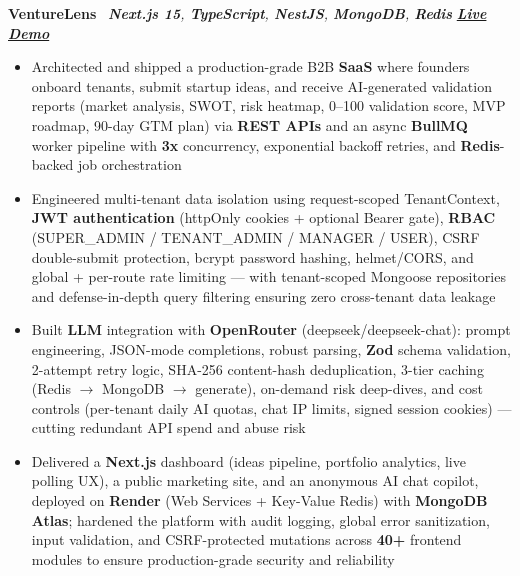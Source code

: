 \documentclass[a4paper,10pt]{article}
\newcommand{\resumeskipentry}{\vspace{5pt}}
\newcommand{\resumejobtitle}{\fontsize{10pt}{12pt}\selectfont\bfseries\color{primary}}
\newcommand{\resumejobmeta}{\fontsize{10pt}{12pt}\selectfont\itshape\color{bodytext}}
\newcommand{\resumedate}{\fontsize{10pt}{12pt}\selectfont\itshape\color{bodytext}}
\newcommand{\kw}[1]{\textbf{\color{primary}#1}}
\newcommand{\metric}[1]{\textbf{\color{accent}#1}}
\newcommand{\demolink}[2]{\href{#1}{\textcolor{accent}{\textbf{#2}}}}
\newcommand{\projectentry}[4]{%
    \noindent
    {\resumejobtitle #1} \textbar\ {\resumejobmeta #2} \hfill {\resumedate #3}%
    \begin{itemize}
        #4
    \end{itemize}%
    \resumeskipentry
}
\begin{document}
\projectentry{VentureLens}{\kw{Next.js 15}, \kw{TypeScript}, \kw{NestJS}, \kw{MongoDB}, \kw{Redis}}{\demolink{https://venturelens-dhqq.onrender.com}{Live Demo}}{%
    \item Architected and shipped a production-grade B2B \kw{SaaS} where founders onboard tenants, submit startup ideas, and receive AI-generated validation reports (market analysis, SWOT, risk heatmap, 0--100 validation score, MVP roadmap, 90-day GTM plan) via \kw{REST APIs} and an async \kw{BullMQ} worker pipeline with \metric{3x} concurrency, exponential backoff retries, and \kw{Redis}-backed job orchestration
    \item Engineered multi-tenant data isolation using request-scoped TenantContext, \kw{JWT authentication} (httpOnly cookies + optional Bearer gate), \kw{RBAC} (SUPER\_ADMIN / TENANT\_ADMIN / MANAGER / USER), CSRF double-submit protection, bcrypt password hashing, helmet/CORS, and global + per-route rate limiting --- with tenant-scoped Mongoose repositories and defense-in-depth query filtering ensuring zero cross-tenant data leakage
    \item Built \kw{LLM} integration with \kw{OpenRouter} (deepseek/deepseek-chat): prompt engineering, JSON-mode completions, robust parsing, \kw{Zod} schema validation, 2-attempt retry logic, SHA-256 content-hash deduplication, 3-tier caching (Redis $\rightarrow$ MongoDB $\rightarrow$ generate), on-demand risk deep-dives, and cost controls (per-tenant daily AI quotas, chat IP limits, signed session cookies) --- cutting redundant API spend and abuse risk
    \item Delivered a \kw{Next.js} dashboard (ideas pipeline, portfolio analytics, live polling UX), a public marketing site, and an anonymous AI chat copilot, deployed on \kw{Render} (Web Services + Key-Value Redis) with \kw{MongoDB Atlas}; hardened the platform with audit logging, global error sanitization, input validation, and CSRF-protected mutations across \metric{40+} frontend modules to ensure production-grade security and reliability
}
\end{document}
